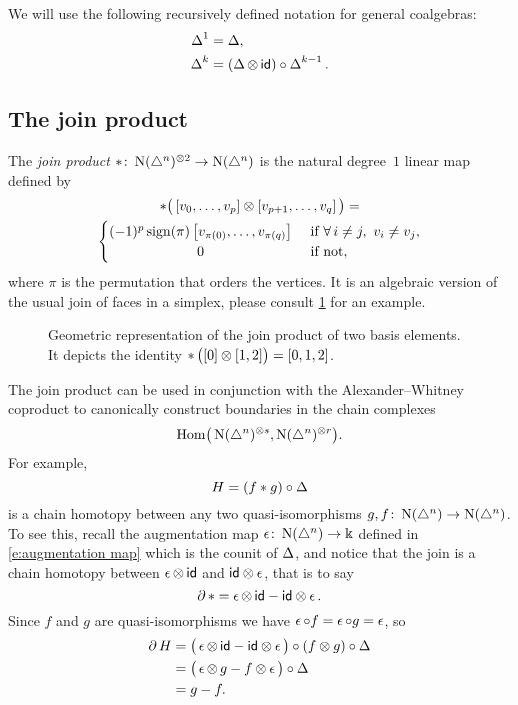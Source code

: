 We will use the following recursively defined notation for general coalgebras:
\begin{align*}
\operatorname{\Delta}^1 &= \operatorname{\Delta}, \\
\operatorname{\Delta}^k &= (\operatorname{\Delta} \otimes \, \mathsf{id}) \circ \operatorname{\Delta}^{k-1}.
\end{align*}

\subsection{The join product}

The \textit{join product} $\ast \colon \operatorname{N}(\triangle^n)^{\otimes 2} \to \operatorname{N}(\triangle^n)$ is the natural degree~$1$ linear map defined by
\begin{multline}
\ast \big(\left[v_0, \dots, v_p \right] \ot \left[v_{p+1}, \dots, v_q\right]\big) = \\
\begin{cases} (-1)^{p} \sign(\pi) \left[v_{\pi(0)}, \dots, v_{\pi(q)}\right] & \text{ if } \forall\, i \neq j, \ v_i \neq v_j, \\
\hfil 0 & \text{ if not}, \end{cases}
\end{multline}
where $\pi$ is the permutation that orders the vertices.
It is an algebraic version of the usual join of faces in a simplex, please consult \cref{f:join of faces} for an example.

\begin{figure}
	
	\caption{Geometric representation of the join product of two basis elements. It depicts the identity $\operatorname{\ast} \big( [0] \otimes [1,2] \big) = [0,1,2]$.}
	\label{f:join of faces}
\end{figure}

The join product can be used in conjunction with the Alexander--Whitney coproduct to canonically construct boundaries in the chain complexes
\[
\mathrm{Hom} \big( \operatorname{N}(\triangle^n)^{\otimes s}, \operatorname{N}(\triangle^n)^{\otimes r} \big).
\]
For example,
\[
H = (f \ast g) \circ \operatorname{\Delta}
\]
is a chain homotopy between any two quasi-isomorphisms $g, f \colon \operatorname{N}(\triangle^n) \to \operatorname{N}(\triangle^n)$.
To see this, recall the augmentation map $\operatorname{\epsilon} \colon \operatorname{N}(\triangle^n) \to \Bbbk$ defined in \eqref{e:augmentation map} which is the counit of $\operatorname{\Delta}$, and notice that the join is a chain homotopy between $\operatorname{\epsilon} \otimes \, \mathsf{id}$ and $\mathsf{id} \otimes \operatorname{\epsilon}$, that is to say
\begin{equation}
\partial \operatorname{\ast} = \operatorname{\epsilon} \otimes \, \mathsf{id} - \mathsf{id} \otimes \operatorname{\epsilon}.
\end{equation}
Since $f$ and $g$ are quasi-isomorphisms we have $\operatorname{\epsilon} \circ f = \operatorname{\epsilon} \circ g = \operatorname{\epsilon}$, so
\begin{align*}
\operatorname{\partial} H &=
\big( \operatorname{\epsilon} \otimes \, \mathsf{id} - \mathsf{id} \otimes \operatorname{\epsilon} \big) \circ (f \otimes g) \circ \operatorname{\Delta} \\ &=
\big(\operatorname{\epsilon} \otimes \, g - f \otimes \operatorname{\epsilon} \big) \circ \operatorname{\Delta} \\ &= g - f.
\end{align*}

